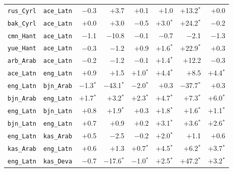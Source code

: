 \begin{longtable}{@{}ll rrr rrr@{}}
\texttt{rus\_Cyrl} & \texttt{ace\_Latn} & $-$0.3\phantom{$^{*}$} & $+$3.7\phantom{$^{*}$} & $+$0.1\phantom{$^{*}$} & $+$1.0\phantom{$^{*}$} & $+$13.2$^{*}$ & $+$0.0\phantom{$^{*}$} \\
\texttt{bak\_Cyrl} & \texttt{ace\_Latn} & $+$0.0\phantom{$^{*}$} & $+$3.0\phantom{$^{*}$} & $-$0.5\phantom{$^{*}$} & $+$3.0$^{*}$ & $+$24.2$^{*}$ & $-$0.2\phantom{$^{*}$} \\
\texttt{cmn\_Hant} & \texttt{ace\_Latn} & $-$1.1\phantom{$^{*}$} & $-$10.8\phantom{$^{*}$} & $-$0.1\phantom{$^{*}$} & $-$0.7\phantom{$^{*}$} & $-$2.1\phantom{$^{*}$} & $-$1.3\phantom{$^{*}$} \\
\texttt{yue\_Hant} & \texttt{ace\_Latn} & $-$0.3\phantom{$^{*}$} & $-$1.2\phantom{$^{*}$} & $+$0.9\phantom{$^{*}$} & $+$1.6$^{*}$ & $+$22.9$^{*}$ & $+$0.3\phantom{$^{*}$} \\
\texttt{arb\_Arab} & \texttt{ace\_Latn} & $-$0.2\phantom{$^{*}$} & $-$1.2\phantom{$^{*}$} & $-$0.1\phantom{$^{*}$} & $+$1.4$^{*}$ & $+$12.2\phantom{$^{*}$} & $-$0.3\phantom{$^{*}$} \\
\texttt{ace\_Latn} & \texttt{eng\_Latn} & $+$0.9\phantom{$^{*}$} & $+$1.5\phantom{$^{*}$} & $+$1.0$^{*}$ & $+$4.4$^{*}$ & $+$8.5\phantom{$^{*}$} & $+$4.4$^{*}$ \\
\midrule
\texttt{eng\_Latn} & \texttt{bjn\_Arab} & $-$1.3$^{*}$ & $-$43.1$^{*}$ & $-$2.0$^{*}$ & $+$0.3\phantom{$^{*}$} & $-$37.7$^{*}$ & $+$0.3\phantom{$^{*}$} \\
\texttt{bjn\_Arab} & \texttt{eng\_Latn} & $+$1.7$^{*}$ & $+$3.2$^{*}$ & $+$2.3$^{*}$ & $+$4.7$^{*}$ & $+$7.3$^{*}$ & $+$6.0$^{*}$ \\
\texttt{eng\_Latn} & \texttt{bjn\_Latn} & $+$0.8\phantom{$^{*}$} & $+$1.9$^{*}$ & $+$0.3\phantom{$^{*}$} & $+$1.8$^{*}$ & $+$1.6$^{*}$ & $+$1.1$^{*}$ \\
\texttt{bjn\_Latn} & \texttt{eng\_Latn} & $+$0.7\phantom{$^{*}$} & $+$0.9\phantom{$^{*}$} & $+$0.2\phantom{$^{*}$} & $+$3.1$^{*}$ & $+$3.6$^{*}$ & $+$2.6$^{*}$ \\
\texttt{eng\_Latn} & \texttt{kas\_Arab} & $+$0.5\phantom{$^{*}$} & $-$2.5\phantom{$^{*}$} & $-$0.2\phantom{$^{*}$} & $+$2.0$^{*}$ & $+$1.1\phantom{$^{*}$} & $+$0.6\phantom{$^{*}$} \\
\texttt{kas\_Arab} & \texttt{eng\_Latn} & $+$0.6\phantom{$^{*}$} & $+$1.3\phantom{$^{*}$} & $+$0.7$^{*}$ & $+$4.5$^{*}$ & $+$6.2$^{*}$ & $+$3.7$^{*}$ \\
\texttt{eng\_Latn} & \texttt{kas\_Deva} & $-$0.7\phantom{$^{*}$} & $-$17.6$^{*}$ & $-$1.0$^{*}$ & $+$2.5$^{*}$ & $+$47.2$^{*}$ & $+$3.2$^{*}$ \\

\end{longtable}

